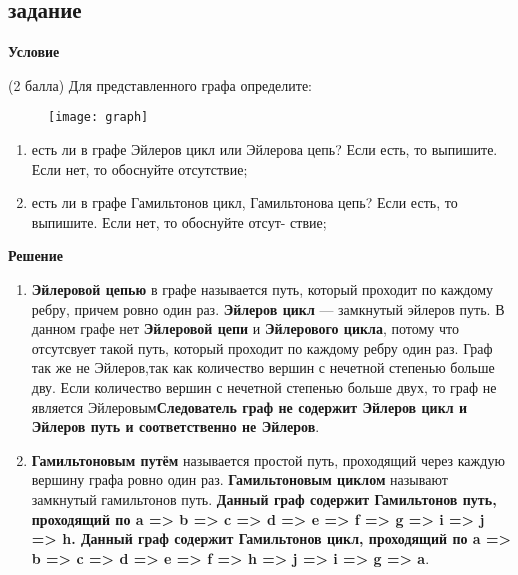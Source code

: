 \documentclass[a4paper]{article}
\begin{document}
\begin{center}
\newpage

\section{задание}

\begin{flushleft}
    \textbf{{\Large Условие}}
\end{flushleft}
\begin{flushleft}
(2 балла) Для представленного графа определите:
\begin{figure}[h]
\texttt{[image: graph]}
\centering
\end{figure}
\begin{enumerate}
  \item есть ли в графе Эйлеров цикл или Эйлерова цепь? Если есть, то выпишите. Если нет, то обоснуйте отсутствие;
  \item есть ли в графе Гамильтонов цикл, Гамильтонова цепь? Если есть, то выпишите. Если нет, то обоснуйте отсут- ствие;
\end{enumerate}
\end{flushleft}
\hfill \break
\begin{flushleft}
    \textbf{{\Large Решение}}
\end{flushleft}
\begin{flushleft}
\begin{enumerate}
  \item\textbf{Эйлеровой цепью} в графе называется путь, который проходит по каждому       ребру, причем ровно один раз.
        \textbf{Эйлеров цикл} — замкнутый эйлеров путь.
        В данном графе нет \textbf{Эйлеровой цепи} и \textbf{Эйлерового цикла}, потому что отсутсвует такой путь, который проходит по каждому ребру один раз. Граф так же не Эйлеров,так как количество вершин с нечетной степенью больше дву. Если количество вершин с нечетной степенью больше двух, то граф не является Эйлеровым\textbf{Следователь граф не содержит Эйлеров цикл и Эйлеров путь и соответственно не Эйлеров}.
  \item \textbf{Гамильтоновым путём} называется простой путь, проходящий через каждую вершину графа ровно один раз. \textbf{Гамильтоновым циклом} называют замкнутый гамильтонов путь. \textbf{Данный граф содержит Гамильтонов путь, проходящий по a => b => c => d => e => f => g => i => j => h. Данный граф содержит Гамильтонов цикл, проходящий по a => b => c => d => e => f => h => j => i => g => a}.
\end{enumerate}
\end{flushleft}


\end{center}
\end{document}
